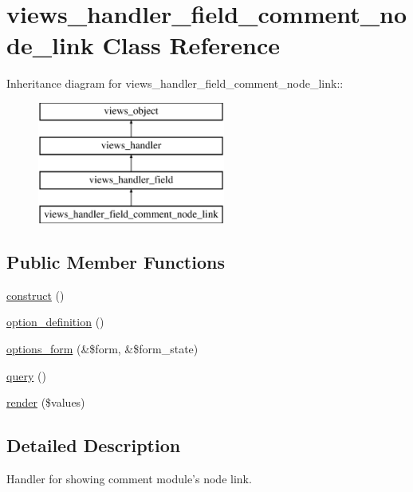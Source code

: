 \hypertarget{classviews__handler__field__comment__node__link}{
\section{views\_\-handler\_\-field\_\-comment\_\-node\_\-link Class Reference}
\label{classviews__handler__field__comment__node__link}
}
Inheritance diagram for views\_\-handler\_\-field\_\-comment\_\-node\_\-link::\begin{figure}[H]
\begin{center}
\leavevmode
\includegraphics[height=4cm]{classviews__handler__field__comment__node__link}
\end{center}
\end{figure}
\subsection*{Public Member Functions}
\begin{CompactItemize}
\item 
\hyperlink{classviews__handler__field__comment__node__link_6a8823310c2ef5c3a70e6a394e45e699}{construct} ()
\item 
\hyperlink{classviews__handler__field__comment__node__link_b4da7290cf0b97776fcc70c4f799e567}{option\_\-definition} ()
\item 
\hyperlink{classviews__handler__field__comment__node__link_4a4be3287da8267b5571d1fe404f9070}{options\_\-form} (\&\$form, \&\$form\_\-state)
\item 
\hyperlink{classviews__handler__field__comment__node__link_f48614fab00f4f6b8ec7e68a3d352b20}{query} ()
\item 
\hyperlink{classviews__handler__field__comment__node__link_57a6cd4b57779b44220bc89f48c86ee6}{render} (\$values)
\end{CompactItemize}


\subsection{Detailed Description}
Handler for showing comment module's node link. 

